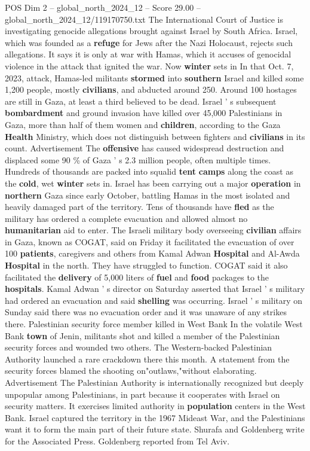 \begin{textsample}{POS Dim 2 – global\_north\_2024\_12 – Score 29.00 – global\_north\_2024\_12/119170750.txt}
The International Court of Justice is investigating genocide allegations brought against Israel by South Africa.
Israel, which was founded as a \textbf{refuge} for Jews after the Nazi Holocaust, rejects such allegations.
It says it is only at war with Hamas, which it accuses of genocidal violence in the attack that ignited the war.
Now \textbf{winter} sets in In that Oct. 7, 2023, attack, Hamas-led militants \textbf{stormed} into \textbf{southern} Israel and killed some 1,200 people, mostly \textbf{civilians}, and abducted around 250.
Around 100 hostages are still in Gaza, at least a third believed to be dead.
Israel ' s subsequent \textbf{bombardment} and ground invasion have killed over 45,000 Palestinians in Gaza, more than half of them women and \textbf{children}, according to the Gaza \textbf{Health} Ministry, which does not distinguish between fighters and \textbf{civilians} in its count.
Advertisement The \textbf{offensive} has caused widespread destruction and displaced some 90 \% of Gaza ' s 2.3 million people, often multiple times.
Hundreds of thousands are packed into squalid \textbf{tent} \textbf{camps} along the coast as the \textbf{cold}, wet \textbf{winter} sets in.
Israel has been carrying out a major \textbf{operation} in \textbf{northern} Gaza since early October, battling Hamas in the most isolated and heavily damaged part of the territory.
Tens of thousands have \textbf{fled} as the military has ordered a complete evacuation and allowed almost no \textbf{humanitarian} aid to enter.
The Israeli military body overseeing \textbf{civilian} affairs in Gaza, known as COGAT, said on Friday it facilitated the evacuation of over 100 \textbf{patients}, caregivers and others from Kamal Adwan \textbf{Hospital} and Al-Awda \textbf{Hospital} in the north.
They have struggled to function.
COGAT said it also facilitated the \textbf{delivery} of 5,000 liters of \textbf{fuel} and \textbf{food} packages to the \textbf{hospitals}.
Kamal Adwan ' s director on Saturday asserted that Israel ' s military had ordered an evacuation and said \textbf{shelling} was occurring.
Israel ' s military on Sunday said there was no evacuation order and it was unaware of any strikes there.
Palestinian security force member killed in West Bank In the volatile West Bank \textbf{town} of Jenin, militants shot and killed a member of the Palestinian security forces and wounded two others.
The Western-backed Palestinian Authority launched a rare crackdown there this month.
A statement from the security forces blamed the shooting on"outlaws,"without elaborating.
Advertisement The Palestinian Authority is internationally recognized but deeply unpopular among Palestinians, in part because it cooperates with Israel on security matters.
It exercises limited authority in \textbf{population} centers in the West Bank.
Israel captured the territory in the 1967 Mideast War, and the Palestinians want it to form the main part of their future state.
Shurafa and Goldenberg write for the Associated Press.
Goldenberg reported from Tel Aviv.


\end{textsample}
